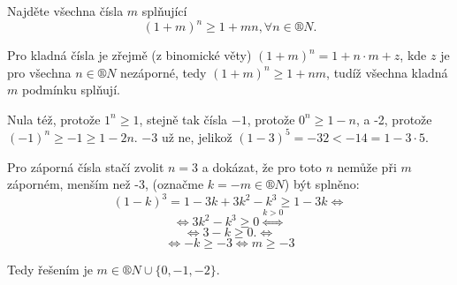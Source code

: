 \documentclass[12pt]{article}					%
\begin{document}
\begin{priklad}
    Najděte všechna čísla $m$ splňující
    $$ (1+m)^n ≥ 1+mn, \forall n \in ®N. $$

    \begin{reseni}
        Pro kladná čísla je zřejmě (z binomické věty) $(1+m)^n = 1 + n·m + z$, kde $z$ je pro všechna $n \in ®N$ nezáporné, tedy $(1+m)^n ≥ 1+nm$, tudíž všechna kladná $m$ podmínku splňují.

        Nula též, protože $1^n ≥ 1$, stejně tak čísla $-1$, protože $0^n≥1-n$, a -2, protože $(-1)^n≥-1≥1-2n$. $-3$ už ne, jelikož $(1-3)^5 = -32 < -14 = 1-3·5$.

        Pro záporná čísla stačí zvolit $n=3$ a dokázat, že pro toto $n$ nemůže při $m$ záporném, menším než -3, (označme $k = -m \in ®N$) být splněno:
        $$ (1-k)^3 = 1-3k+3k^2-k^3 ≥ 1 - 3k \Leftrightarrow $$
        $$ \Leftrightarrow 3k^2-k^3 ≥ 0 \overset{k > 0}{\Leftrightarrow} $$
        $$ \Leftrightarrow 3 - k ≥ 0. \Leftrightarrow $$
        $$ \Leftrightarrow -k ≥ -3 \Leftrightarrow m ≥ -3$$ 

        Tedy řešením je $m \in ®N \cup \{0, -1, -2\}$.
        
    \end{reseni}
\end{priklad}
\end{document}
